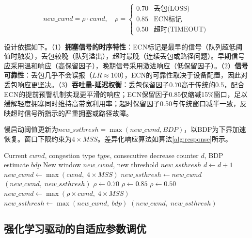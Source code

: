 \documentclass[10pt,twocolumn]{article}
\begin{document}
\begin{equation}
new\_cwnd = \rho \cdot cwnd, \quad \rho = \begin{cases}
0.70 & \text{丢包(LOSS)} \\
0.85 & \text{ECN标记} \\
0.50 & \text{超时(TIMEOUT)}
\end{cases}
\end{equation}

设计依据如下。（1）\textbf{拥塞信号的时序特性}：ECN标记是最早的信号（队列超低阈值时触发），丢包较晚（队列溢出），超时最晚（连续丢包或路径问题）。早期信号应采用温和响应（高保留因子），晚期信号采用激进响应（低保留因子）。（2）\textbf{信号可靠性}：丢包几乎不会误报（$LR \approx 100$），ECN的可靠性取决于设备配置，因此对丢包响应更坚决。（3）\textbf{吞吐量-延迟权衡}：丢包保留因子0.70高于传统的0.5，配合ECN的提前预警机制实现更平滑的响应；ECN保留因子0.85仅缩减15\%窗口，足以缓解轻度拥塞同时维持高带宽利用率；超时保留因子0.50与传统窗口减半一致，反映超时信号所指示的严重拥塞或路径故障。

慢启动阈值更新为$new\_ssthresh = \max(new\_cwnd, BDP)$，以BDP为下界加速恢复。窗口下限约束为$4 \times MSS$。差异化响应算法如算法\ref{alg:response}所示。

\begin{algorithm}[htbp]
\caption{Differentiated Congestion Response}
\label{alg:response}
\small
\begin{algorithmic}[1]
\REQUIRE Current $cwnd$, congestion type $type$, consecutive decrease counter $d$, BDP estimate $bdp$
\ENSURE New window $new\_cwnd$, new threshold $new\_ssthresh$
\STATE $d \leftarrow d + 1$
    \STATE $new\_cwnd \leftarrow \max(cwnd, \; 4 \times MSS)$ 
    \STATE $new\_ssthresh \leftarrow new\_cwnd$
    \RETURN $(new\_cwnd, \; new\_ssthresh)$
\ENDIF
{}
    \STATE $\rho \leftarrow 0.70$
    \STATE $\rho \leftarrow 0.85$
    \STATE $\rho \leftarrow 0.50$
\ENDIF
\STATE $new\_cwnd \leftarrow \max(\rho \times cwnd, \; 4 \times MSS)$
\STATE $new\_ssthresh \leftarrow \max(new\_cwnd, \; bdp)$
\RETURN $(new\_cwnd, \; new\_ssthresh)$
\end{algorithmic}
\end{algorithm}

\subsection{强化学习驱动的自适应参数调优}
\end{document}
